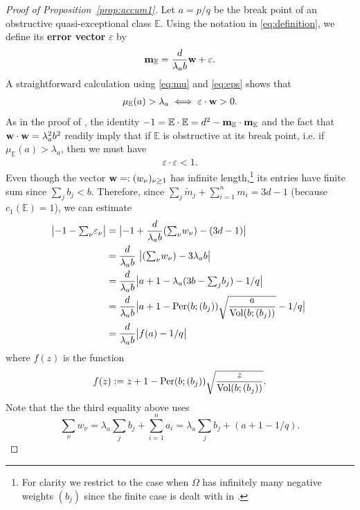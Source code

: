 \documentclass[11pt, reqno]{amsart}
\theoremstyle{remark}
\numberwithin{equation}{subsection}
\numberwithin{figure}{section}
\theoremstyle{customremark}
\newcommand{\Vol}{{\rm Vol}}
\newcommand{\Per}{{\rm Per}}
\newcommand{\bbm}{{\bf m}}
\newcommand{\bw}{{\bf w}}
\newcommand{\Tm}{{\widetilde m}}
\newcommand{\bE}{{\mathbb E}}
\newcommand{\Om}{{\Omega}}
\newcommand{\la}{{\lambda}}
\newcommand{\eps}{\varepsilon}
\begin{document}
\begin{proof}[Proof of Proposition~\ref{prop:accum1}]
Let $a=p/q$ be the break point of an obstructive  quasi-exceptional class $\bE$.  Using the notation in \eqref{eq:definition}, we define its {\bf error vector} $\eps$ by 
\begin{align}\label{eq:eps}
\bbm_{\bE} = \frac{d}{\la_a b} \bw + \eps.
\end{align} 
A straightforward calculation using \eqref{eq:mu} and \eqref{eq:eps} shows that
\begin{align}\label{eq:key1}
\mu_{\bE}(a) > \la_a \;\Longleftrightarrow \; \eps\cdot \bw > 0.
\end{align}
As in the proof of \cite[(4.6)]{AADT},  the identity $-1 = \bE\cdot\bE =  d^2  -\bbm_{\bE}\cdot \bbm_{\bE} $ 
and the fact that $\bw\cdot \bw = \la_a^2 b^2$ readily imply that if $\bE$ is obstructive at its break point, i.e. if $\mu_\bE(a) > \la_a$, then
 we must have
\begin{align}\label{eq:eps2}
\eps\cdot \eps< 1.
\end{align}
Even though the vector $\bw =:(w_\nu)_{\nu\ge1}$  has infinite length,\footnote
{
For clarity we restrict to the case when $\Om$ has infinitely many negative weights $(b_j)$ since the finite case is dealt with in \cite{AADT}.} its entries have finite sum since $\sum _j b_j < b$.  Therefore, since $\sum_j \Tm_j + {\textstyle \sum_{i=1}^n} m_i = 3d-1$ (because $c_1(\bE) = 1$),  we can estimate
\begin{align} \notag
\bigl|-1-{\textstyle \sum_\nu} \eps_\nu\bigr|  &  = \bigl| -1+ \frac d{\la_ab} ({\textstyle \sum_\nu} w_\nu) - (3d-1) \bigr|\\ \notag
&=  \frac d{\la_ab}\  \bigl| ({\textstyle \sum_\nu} w_\nu) - 3\la_a b \bigr|\\ \notag
& = \frac d{\la_ab} \bigl| a+1-\la_a (3b- {\textstyle \sum_j} b_j) -  1/q\bigr|\\ \notag
&= \frac d{\la_ab} \bigl| a+1- \Per(b;(b_j))\sqrt {\frac{a}{\Vol(b;(b_j))}} -  1/q\bigr|\
\\ 
&= \frac d{\la_ab}\bigl| f(a) - 1/q\bigr|
\end{align}
where  $f(z)$ is the function
\begin{align}\label{eq:f}
f(z): =  z+1- \Per(b;(b_j)) \sqrt { \frac{z}{\Vol(b;(b_j))}}.
\end{align}
Note that the
the third equality above uses 
$$
{\textstyle \sum_\nu }w_\nu = \la_a{\textstyle \sum_j} b_j + {\textstyle \sum_{i=1}^n} a_i =  \la_a{\textstyle \sum_j} b_j  +  (a + 1 -  1/q).
$$



\end{proof}
\end{document}
